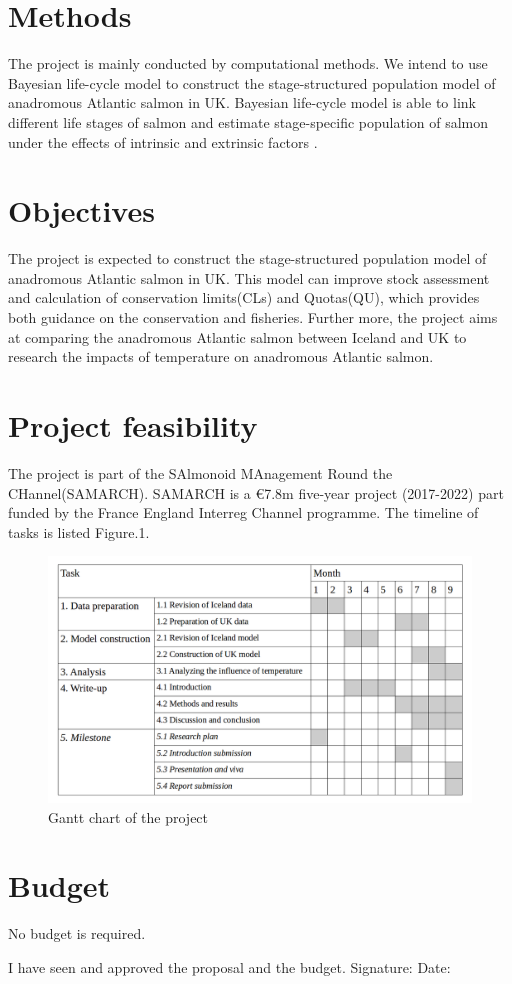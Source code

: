 \documentclass[11pt]{article}
\begin{document}
\begin{linenumbers}
\section{Methods}
The project is mainly conducted by computational methods. We intend to use Bayesian life-cycle model to construct the stage-structured population model of anadromous Atlantic salmon in UK. Bayesian life-cycle model is able to link different life stages of salmon and estimate stage-specific population of salmon under the effects of intrinsic and extrinsic factors \cite{ohlberger2018bayesian}. 

\section{Objectives}
The project is expected to construct the stage-structured population model of anadromous Atlantic salmon in UK. This model can improve stock assessment and calculation of conservation limits(CLs) and Quotas(QU), which provides both guidance on the conservation and fisheries. Further more, the project aims at comparing the anadromous Atlantic salmon between Iceland and UK to research the impacts of temperature on anadromous Atlantic salmon. 

\section{Project feasibility}
The project is part of the SAlmonoid MAnagement Round the CHannel(SAMARCH). SAMARCH is a €7.8m five-year project (2017-2022) part funded by the France England Interreg Channel programme. 
The timeline of tasks is listed Figure.1.
\begin{figure}[H]
   \includegraphics[width=\textwidth]{gantt_chart.png}
   \caption{Gantt chart of the project}
\end{figure}

\section{Budget}
No budget is required.




\end{linenumbers}


\newpage
\LARGE
I have seen and approved the proposal and the budget.
\bigbreak
\bigbreak
\bigbreak
\bigbreak
\large
Signature:
\bigbreak
\bigbreak
Date:
\end{document}
